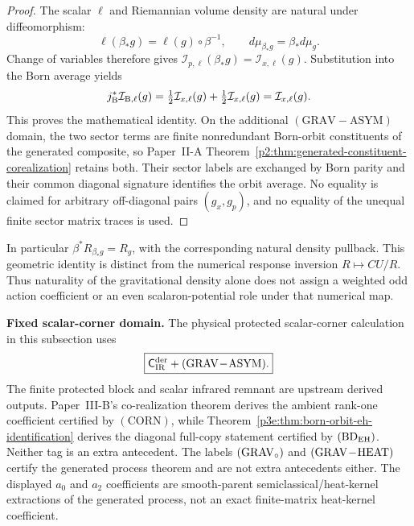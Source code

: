 \documentclass[12pt,a4paper]{article}
\begin{document}
\begin{proof}
The scalar \(\ell\) and Riemannian volume density are natural under
diffeomorphism:
\[
 \ell(\beta_*g)=\ell(g)\circ\beta^{-1},
 \qquad
 d\mu_{\beta_*g}=\beta_*d\mu_g.
\]
Change of variables therefore gives
\(\mathcal I_{p,\ell}(\beta_*g)=\mathcal I_{x,\ell}(g)\).  Substitution into the Born
average yields
\[
 j_{\rm B}^*\mathcal I_{{\rm B},\ell}(g)
 =\tfrac12\mathcal I_{x,\ell}(g)+\tfrac12\mathcal I_{x,\ell}(g)
 =\mathcal I_{x,\ell}(g).
\]
This proves the mathematical identity.  On the additional
\((\mathrm{GRAV\!-\!ASYM})\) domain, the two sector terms are finite
nonredundant Born-orbit constituents of the generated composite, so Paper~II-A
Theorem~\ref{p2:thm:generated-constituent-corealization} retains both.
Their sector labels are exchanged by Born parity and their common diagonal
signature identifies the orbit average.  No equality is claimed for
arbitrary off-diagonal pairs \((g_x,g_p)\), and no equality of the unequal
finite sector matrix traces is used.
\end{proof}

In particular \(\beta^*R_{\beta_*g}=R_g\), with the corresponding
natural density pullback. This geometric identity is distinct from the
numerical response inversion \(R\mapsto CU/R\). Thus naturality of
the gravitational density alone does not assign a weighted odd action
coefficient or an even scalaron-potential role under that numerical map.


\begin{mdframed}[nobreak=false]
\noindent\textbf{Fixed scalar-corner domain.}
The physical protected scalar-corner calculation in this subsection uses
\[
 \boxed{\mathsf C_{\rm IR}^{\rm der}
 +({\rm GRAV\!-\!ASYM}).}
\]
The finite protected block and scalar infrared remnant are upstream derived
outputs.  Paper~III-B's co-realization theorem derives the ambient rank-one
coefficient certified by \((\mathrm{CORN})\), while
Theorem~\ref{p3e:thm:born-orbit-eh-identification} derives the diagonal
full-copy statement certified by \((\mathrm{BD}_{\rm EH})\).  Neither tag is
an extra antecedent.  The labels \(({\rm GRAV}_{\circ})\) and
\(({\rm GRAV\!-\!HEAT})\) certify the generated process theorem and are not
extra antecedents either.  The displayed \(a_0\) and \(a_2\) coefficients are
smooth-parent semiclassical/heat-kernel extractions of the generated process,
not an exact finite-matrix heat-kernel coefficient.
\end{mdframed}
\end{document}
